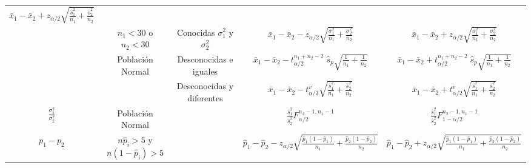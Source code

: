 \documentclass[a4paper,landscape]{article}
\begin{document}
\begin{center}
\begin{tabular}{|c|c|c|c|c|}
  $\displaystyle \bar{x}_{1}-\bar{x}_{2} +
  z_{\alpha/2}\sqrt{\frac{\hat s^2_1}{n_{1}}+\frac{\hat s^2_2}{n_{2}}}$ \\
  \cline{2-5}
  \rule[-.5cm]{0cm}{1.4cm}& $n_1< 30$ o $n_2< 30$  & Conocidas $\sigma_1^2$ y $\sigma_2^2$ &
  $\displaystyle \bar{x}_{1}-\bar{x}_{2} -
  z_{\alpha/2}\sqrt{\frac{\sigma^2_{1}}{n_{1}}+\frac{\sigma^2_{2}}{n_{2}}}$ &
  $\displaystyle \bar{x}_{1}-\bar{x}_{2} +
  z_{\alpha/2}\sqrt{\frac{\sigma^2_{1}}{n_{1}}+\frac{\sigma^2_{2}}{n_{2}}}$ \\ \cline{3-5}
  \rule[-.5cm]{0cm}{1.2cm} & Población Normal & Desconocidas e iguales &
  $\displaystyle \bar{x}_{1}-\bar{x}_{2} -
  t^{n_1+n_2-2}_{\alpha/2}\;\hat s_p\sqrt{\frac{1}{n_{1}}+\frac{1}{n_{2}}}$ &
  $\displaystyle \bar{x}_{1}-\bar{x}_{2} +
  t^{n_1+n_2-2}_{\alpha/2}\;\hat s_p\sqrt{\frac{1}{n_{1}}+\frac{1}{n_{2}}}$ \\ \cline{3-5}
  \rule[-.5cm]{0cm}{1.3cm} &  & Desconocidas y diferentes &
  $\displaystyle \bar{x}_{1}-\bar{x}_{2} -
  t^v_{\alpha/2}\sqrt{\frac{\hat s^2_1}{n_{1}}+\frac{\hat s^2_2}{n_{2}}}$ &
  $\displaystyle \bar{x}_{1}-\bar{x}_{2} +
  t^v_{\alpha/2}\sqrt{\frac{\hat s^2_1}{n_{1}}+\frac{\hat s^2_2}{n_{2}}}$ \\ \hline
  \rule[-.5cm]{0cm}{1.2cm} $\displaystyle \frac{\sigma_1^2}{\sigma_2^2}$ & Población Normal & &
  $\displaystyle \frac{\hat s^2_1}{\hat s^2_2}F^{n_{2}-1,n_{1}-1}_{\alpha/2}$ &
  $\displaystyle \frac{\hat s^2_1}{\hat s^2_2}F^{n_{2}-1,n_{1}-1}_{1-\alpha/2}$ \\
  \hline
  \rule[-.5cm]{0cm}{1.3cm}  $p_1-p_2$ & $n\hat{p}_i>5$ y $n(1-\hat{p}_i)>5$ & &
  $\displaystyle \hat{p}_{1}-\hat{p}_{2}-z_{\alpha/2}
  \sqrt{\frac{\hat{p}_{1}(1-\hat{p}_{1})}{n_{1}}+
  \frac{\hat{p}_{2}(1-\hat{p}_{2})}{n_{2}}}$ &
  $\displaystyle \hat{p}_{1}-\hat{p}_{2}+z_{\alpha/2}
  \sqrt{\frac{\hat{p}_{1}(1-\hat{p}_{1})}{n_{1}}+
  \frac{\hat{p}_{2}(1-\hat{p}_{2})}{n_{2}}}$ \\ \hline
\end{tabular}
\end{center}
\newpage
\end{document}
